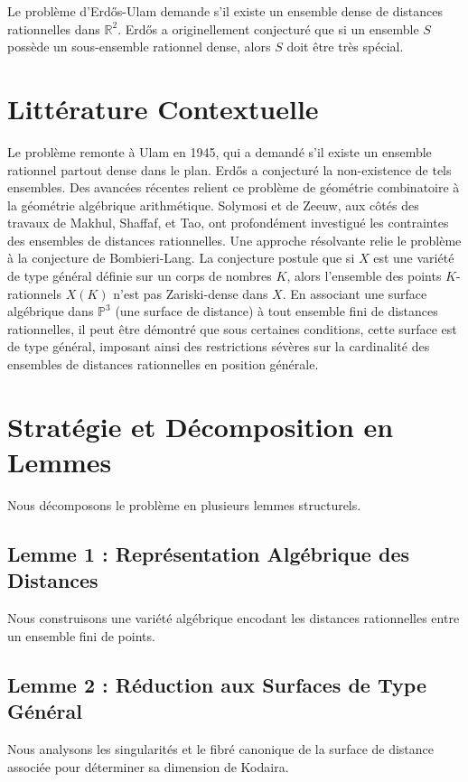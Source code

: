 \documentclass[12pt,a4paper]{article}
\begin{document}
Le probl\`eme d'Erd\H{o}s-Ulam demande s'il existe un ensemble dense de distances rationnelles dans $\mathbb{R}^2$. Erd\H{o}s a originellement conjectur\'e que si un ensemble $S$ poss\`ede un sous-ensemble rationnel dense, alors $S$ doit \^etre tr\`es sp\'ecial.

\section{Litt\'erature Contextuelle}

Le probl\`eme remonte \`a Ulam en 1945, qui a demand\'e s'il existe un ensemble rationnel partout dense dans le plan. Erd\H{o}s a conjectur\'e la non-existence de tels ensembles. Des avanc\'ees r\'ecentes relient ce probl\`eme de g\'eom\'etrie combinatoire \`a la g\'eom\'etrie alg\'ebrique arithm\'etique. Solymosi et de Zeeuw, aux c\^ot\'es des travaux de Makhul, Shaffaf, et Tao, ont profond\'ement investigu\'e les contraintes des ensembles de distances rationnelles. Une approche r\'esolvante relie le probl\`eme \`a la conjecture de Bombieri-Lang. La conjecture postule que si $X$ est une vari\'et\'e de type g\'en\'eral d\'efinie sur un corps de nombres $K$, alors l'ensemble des points $K$-rationnels $X(K)$ n'est pas Zariski-dense dans $X$. En associant une surface alg\'ebrique dans $\mathbb{P}^3$ (une surface de distance) \`a tout ensemble fini de distances rationnelles, il peut \^etre d\'emontr\'e que sous certaines conditions, cette surface est de type g\'en\'eral, imposant ainsi des restrictions s\'ev\`eres sur la cardinalit\'e des ensembles de distances rationnelles en position g\'en\'erale.

\section{Strat\'egie et D\'ecomposition en Lemmes}

Nous d\'ecomposons le probl\`eme en plusieurs lemmes structurels.

\subsection{Lemme 1 : Repr\'esentation Alg\'ebrique des Distances}
Nous construisons une vari\'et\'e alg\'ebrique encodant les distances rationnelles entre un ensemble fini de points.

\subsection{Lemme 2 : R\'eduction aux Surfaces de Type G\'en\'eral}
Nous analysons les singularit\'es et le fibr\'e canonique de la surface de distance associ\'ee pour d\'eterminer sa dimension de Kodaira.
\end{document}
